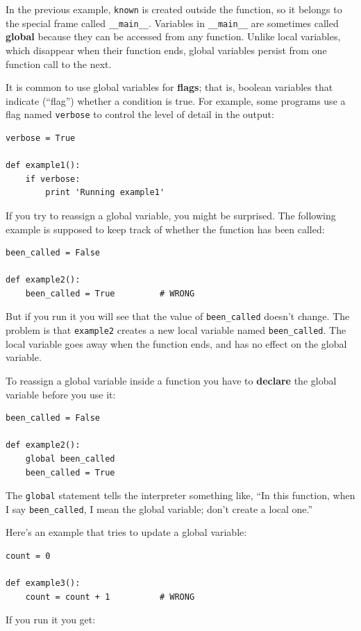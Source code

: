 \documentclass[10pt]{book}
\begin{document}
In the previous example, {\tt known} is created outside the function,
so it belongs to the special frame called \verb"__main__".
Variables in \verb"__main__" are sometimes called {\bf global}
because they can be accessed from any function.  Unlike local
variables, which disappear when their function ends, global variables
persist from one function call to the next.

It is common to use global variables for {\bf flags}; that is,
boolean variables that indicate (``flag'') whether a condition
is true.  For example, some programs use
a flag named {\tt verbose} to control the level of detail in the
output:

\begin{verbatim}
verbose = True

def example1():
    if verbose:
        print 'Running example1'
\end{verbatim}
%
If you try to reassign a global variable, you might be surprised.
The following example is supposed to keep track of whether the
function has been called:

\begin{verbatim}
been_called = False

def example2():
    been_called = True         # WRONG
\end{verbatim}
%
But if you run it you will see that the value of \verb"been_called"
doesn't change.  The problem is that {\tt example2} creates a new local
variable named \verb"been_called".  The local variable goes away when
the function ends, and has no effect on the global variable.

To reassign a global variable inside a function you have to
{\bf declare} the global variable before you use it:

\begin{verbatim}
been_called = False

def example2():
    global been_called
    been_called = True
\end{verbatim}
%
The {\tt global} statement tells the interpreter
something like, ``In this function, when I say \verb"been_called", I
mean the global variable; don't create a local one.''

Here's an example that tries to update a global variable:

\begin{verbatim}
count = 0

def example3():
    count = count + 1          # WRONG
\end{verbatim}
%
If you run it you get:
\end{document}
